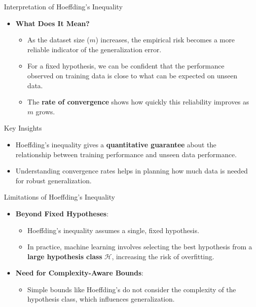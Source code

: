 \documentclass[
  ignorenonframetext,
]{beamer}
\providecommand{\tightlist}{%
  \setlength{\itemsep}{0pt}\setlength{\parskip}{0pt}}\usepackage{longtable,booktabs,array}
\begin{document}
\begin{frame}{Interpretation of Hoeffding's Inequality}
\label{interpretation-of-hoeffdings-inequality}
\begin{itemize}
\tightlist
\item
  \textbf{What Does It Mean?}

  \begin{itemize}
  \tightlist
  \item
    As the dataset size (\(m\)) increases, the empirical risk becomes a
    more reliable indicator of the generalization error.
  \item
    For a fixed hypothesis, we can be confident that the performance
    observed on training data is close to what can be expected on unseen
    data.
  \item
    The \textbf{rate of convergence} shows how quickly this reliability
    improves as \(m\) grows.
  \end{itemize}
\end{itemize}
\end{frame}

\begin{frame}
\begin{block}{Key Insights}
\label{key-insights-2}
\begin{itemize}
\tightlist
\item
  Hoeffding's inequality gives a \textbf{quantitative guarantee} about
  the relationship between training performance and unseen data
  performance.
\item
  Understanding convergence rates helps in planning how much data is
  needed for robust generalization.
\end{itemize}
\end{block}
\end{frame}

\begin{frame}{Limitations of Hoeffding's Inequality}
\label{limitations-of-hoeffdings-inequality}
\begin{itemize}
\tightlist
\item
  \textbf{Beyond Fixed Hypotheses}:

  \begin{itemize}
  \tightlist
  \item
    Hoeffding's inequality assumes a single, fixed hypothesis.
  \item
    In practice, machine learning involves selecting the best hypothesis
    from a \textbf{large hypothesis class} \(\mathcal{H}\), increasing
    the risk of overfitting.
  \end{itemize}
\item
  \textbf{Need for Complexity-Aware Bounds}:

  \begin{itemize}
  \tightlist
  \item
    Simple bounds like Hoeffding's do not consider the complexity of the
    hypothesis class, which influences generalization.
  \end{itemize}
\end{itemize}
\end{frame}
\end{document}
